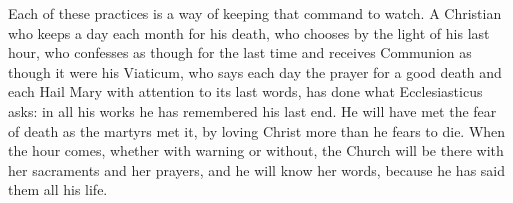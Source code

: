 Each of these practices is a way of keeping that command to watch. A Christian who keeps a day each month for his death, who chooses by the light of his last hour, who confesses as though for the last time and receives Communion as though it were his Viaticum, who says each day the prayer for a good death and each Hail Mary with attention to its last words, has done what Ecclesiasticus asks: in all his works he has remembered his last end. He will have met the fear of death as the martyrs met it, by loving Christ more than he fears to die. When the hour comes, whether with warning or without, the Church will be there with her sacraments and her prayers, and he will know her words, because he has said them all his life.

